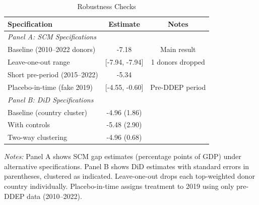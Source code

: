 \begin{table}[t]
\centering
\caption{Robustness Checks}
\label{tab:robustness}
\begin{tabular}{lcc}
\toprule
Specification & Estimate & Notes \\
\midrule
\multicolumn{3}{l}{\textit{Panel A: SCM Specifications}} \\
Baseline (2010--2022 donors) & -7.18 & Main result \\
Leave-one-out range & [-7.94, -7.94] & 1 donors dropped \\
Short pre-period (2015--2022) & -5.34 & \\
Placebo-in-time (fake 2019) & [-4.55, -0.60] & Pre-DDEP period \\
\midrule
\multicolumn{3}{l}{\textit{Panel B: DiD Specifications}} \\
Baseline (country cluster) & -4.96 (1.86) & \\
With controls & -5.48 (2.90) & \\
Two-way clustering & -4.96 (0.68) & \\
\bottomrule
\end{tabular}
\begin{tablenotes}[flushleft]
\small
\item \textit{Notes:} Panel A shows SCM gap estimates (percentage points of GDP) under alternative specifications. Panel B shows DiD estimates with standard errors in parentheses, clustered as indicated. Leave-one-out drops each top-weighted donor country individually. Placebo-in-time assigns treatment to 2019 using only pre-DDEP data (2010--2022).
\end{tablenotes}
\end{table}

